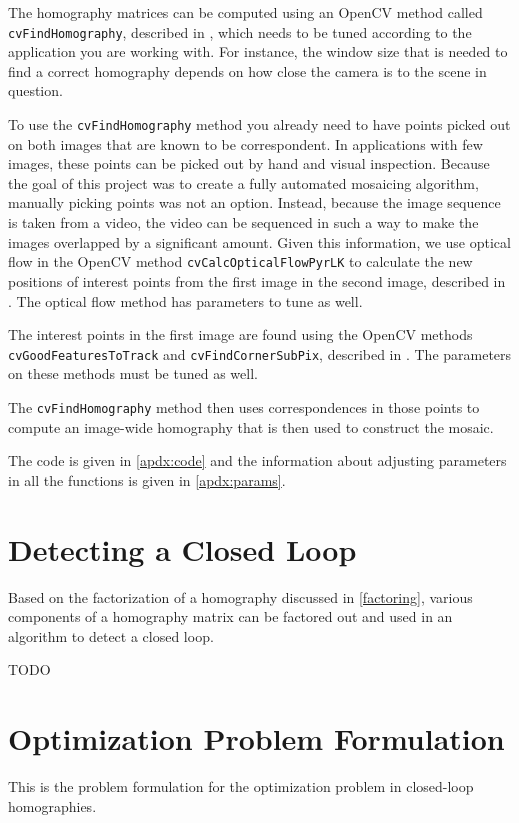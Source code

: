 \documentclass{article}
\begin{document}
The homography matrices can be computed using an OpenCV method called
\verb|cvFindHomography|, described in \cite{cvhomog}, which needs to be tuned
according to the application you are working with. For instance, the window
size that is needed to find a correct homography depends on how close the
camera is to the scene in question. 

To use the \verb|cvFindHomography| method you already need to have points
picked out on both images that are known to be correspondent. In applications
with few images, these points can be picked out by hand and visual inspection.
Because the goal of this project was to create a fully automated mosaicing
algorithm, manually picking points was not an option. Instead, because the
image sequence is taken from a video, the video can be sequenced in such a way
to make the images overlapped by a significant amount. Given this information,
we use optical flow in the OpenCV method \verb|cvCalcOpticalFlowPyrLK| to
calculate the new positions of interest points from the first image in the
second image, described in \cite{opticalflow}. The optical flow method has parameters to tune as well. 

The interest points in the first image are found using the OpenCV methods
\verb|cvGoodFeaturesToTrack| and \verb|cvFindCornerSubPix|, described in
\cite{points}. The parameters on these methods must be tuned as well. 

The \verb|cvFindHomography| method then uses correspondences in those points to
compute an image-wide homography that is then used to construct the mosaic. 

The code is given in \ref{apdx:code} and the information about adjusting parameters in all the functions is given in \ref{apdx:params}.

\section{Detecting a Closed Loop}

Based on the factorization of a homography discussed in \ref{factoring},
various components of a homography matrix can be factored out and used in an
algorithm to detect a closed loop. 

TODO

\section{Optimization Problem Formulation}

This is the problem formulation for the optimization problem in closed-loop
homographies.
\end{document}
